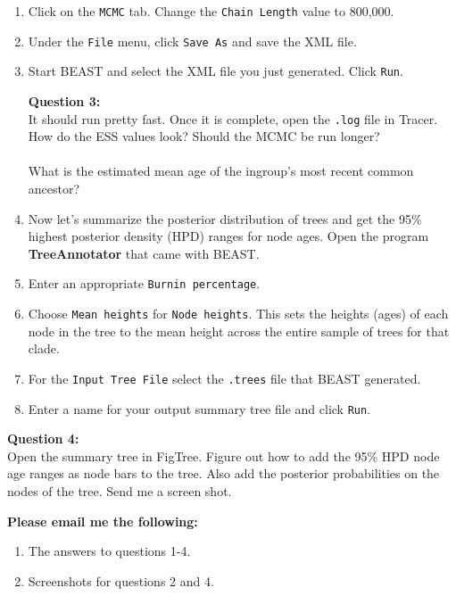 \documentclass[11pt]{article}
\begin{document}
\begin{enumerate}
\item Click on the \texttt{MCMC} tab. Change the \texttt{Chain Length} value
to 800,000.

\item Under the \texttt{File} menu, click \texttt{Save As} and save the XML file.

\item Start BEAST and select the XML file you just generated. Click \texttt{Run}.


\begin{framed}
\noindent
\textbf{Question 3:} \\
It should run pretty fast. Once it is complete, open the \texttt{.log}
file in Tracer. How do the ESS values look? Should the MCMC be run longer? \\
\\
What is the estimated mean age of the ingroup's most recent common ancestor?
\end{framed}

\item Now let's summarize the posterior distribution of trees and get
the 95\% highest posterior density (HPD) ranges for node ages. Open the program
\textbf{TreeAnnotator} that came with BEAST.

\item Enter an appropriate \texttt{Burnin percentage}.

\item Choose \texttt{Mean heights} for \texttt{Node heights}. This sets the heights (ages) of each node in the tree to the mean height across the entire sample of trees for that clade.

\item For the \texttt{Input Tree File} select the \texttt{.trees} file that BEAST
generated.

\item Enter a name for your output summary tree file and click \texttt{Run}.

\end{enumerate}

\begin{framed}
\noindent
\textbf{Question 4:} \\
Open the summary tree in FigTree. Figure out how to add the 
95\% HPD node age ranges as node bars to the tree. 
Also add the posterior probabilities on the nodes of the tree.
Send me a screen shot.
\end{framed}

\begin{framed}
\noindent
\textbf{Please email me the following:}
\begin{enumerate}
  \item The answers to questions 1-4.
  \item Screenshots for questions 2 and 4.
\end{enumerate}
\end{framed}


 
\end{document}
